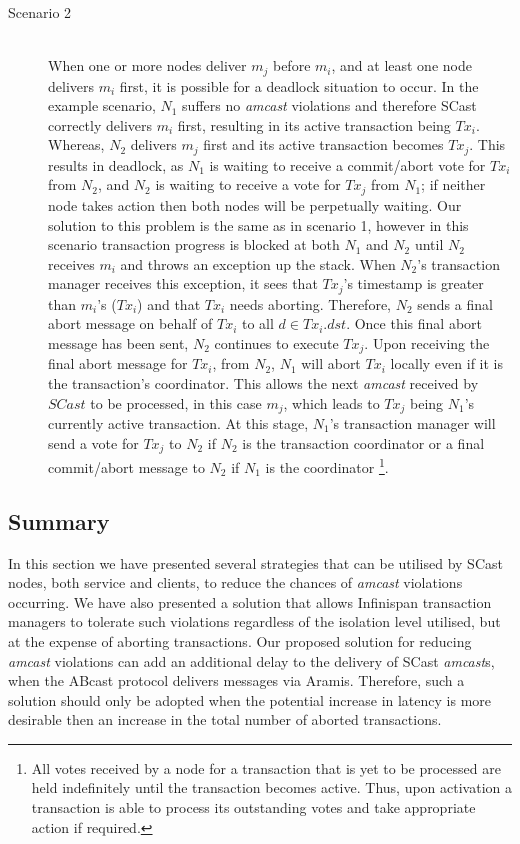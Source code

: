 \begin{description}
         \item[Scenario 2] \hfill \\
         When one or more nodes deliver $m_j$ before $m_i$, and at least one node delivers $m_i$ first, it is possible for a deadlock situation to occur.  In the example scenario, $N_1$ suffers no \emph{amcast} violations and therefore \textsf{SCast} correctly delivers $m_i$ first, resulting in its active transaction being $Tx_i$.  Whereas, $N_2$ delivers $m_j$ first and its active transaction becomes $Tx_j$.  This results in deadlock, as $N_1$ is waiting to receive a commit/abort vote for $Tx_i$ from $N_2$, and $N_2$ is waiting to receive a vote for $Tx_j$ from $N_1$; if neither node takes action then both nodes will be perpetually waiting.  Our solution to this problem is the same as in scenario 1, however in this scenario transaction progress is blocked at both $N_1$ and $N_2$ until $N_2$ receives $m_i$ and throws an exception up the stack.  When $N_2$'s transaction manager receives this exception, it sees that $Tx_j$'s timestamp is greater than $m_i$'s ($Tx_i$) and that $Tx_i$ needs aborting.  Therefore, $N_2$ sends a final abort message on behalf of $Tx_i$ to all $d \in Tx_i.dst$.  Once this final abort message has been sent, $N_2$ continues to execute $Tx_j$.  Upon receiving the final abort message for $Tx_i$, from $N_2$, $N_1$ will abort $Tx_i$ locally even if it is the transaction's coordinator.  This allows the next \emph{amcast} received by $SCast$ to be processed, in this case $m_j$, which leads to $Tx_j$ being $N_1$'s currently active transaction.  At this stage, $N_1$'s transaction manager will send a vote for $Tx_j$ to $N_2$ if $N_2$ is the transaction coordinator or a final commit/abort message to $N_2$ if $N_1$ is the coordinator \footnote{All votes received by a node for a transaction that is yet to be processed are held indefinitely until the transaction becomes active.  Thus, upon activation a transaction is able to process its outstanding votes and take appropriate action if required.}.  
    \end{description}

    \subsection{Summary}
        In this section we have presented several strategies that can be utilised by \textsf{SCast} nodes, both service and clients, to reduce the chances of \emph{amcast} violations occurring.  We have also presented a solution that allows Infinispan transaction managers to tolerate such violations regardless of the isolation level utilised, but at the expense of aborting transactions.  Our proposed solution for reducing \emph{amcast} violations can add an additional delay to the delivery of \textsf{SCast} \emph{amcast}s, when the \textsf{ABcast} protocol delivers messages via \textsf{Aramis}.  Therefore, such a solution should only be adopted when the potential increase in latency is more desirable then an increase in the total number of aborted transactions.  

